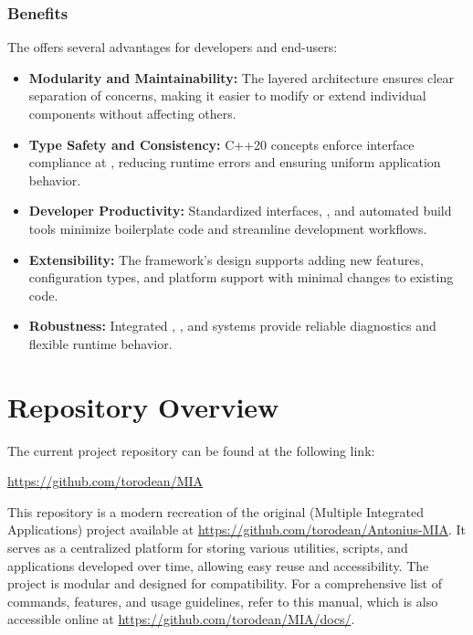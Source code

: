 \subsubsection{Benefits}
The  offers several advantages for developers and end-users:
\begin{itemize}\itemsep0em
	\item \textbf{Modularity and Maintainability:} The layered architecture ensures clear separation of concerns, making it easier to modify or extend individual components without affecting others.
	\item \textbf{Type Safety and Consistency:} C++20 concepts enforce interface compliance at , reducing runtime errors and ensuring uniform application behavior.
	\item \textbf{Developer Productivity:} Standardized interfaces, , and automated build tools minimize boilerplate code and streamline development workflows.
	\item \textbf{Extensibility:} The framework's design supports adding new features, configuration types, and platform support with minimal changes to existing code.
	\item \textbf{Robustness:} Integrated , , and  systems provide reliable diagnostics and flexible runtime behavior.
\end{itemize}





























\section{Repository Overview}

The current project repository can be found at the following link:
\begin{center}
	\url{https://github.com/torodean/MIA}
\end{center}
This repository is a modern recreation of the original  (Multiple Integrated Applications) project available at \url{https://github.com/torodean/Antonius-MIA}. It serves as a centralized platform for storing various utilities, scripts, and applications developed over time, allowing easy reuse and accessibility. The project is modular and designed for  compatibility. For a comprehensive list of commands, features, and usage guidelines, refer to this manual, which is also accessible online at \url{https://github.com/torodean/MIA/docs/}.

